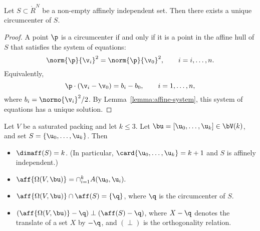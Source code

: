 \begin{lemma}[] 
  Let $S\subset \ring{R}^N$ be a non-empty affinely independent set.
  Then there exists a unique circumcenter of $S$.
\end{lemma}

\begin{proof} 
  A point $\p$ is a circumcenter if and only if it is a point in the
  affine hull of $S$ that satisfies the system of equations:
\begin{displaymath} 
\norm{\p}{\v_i}^2 = \norm{\p}{\v_0}^2,\qquad i = i,\ldots,n.
\end{displaymath}
Equivalently,
\begin{displaymath} 
\p\cdot (\v_i-\v_0) = b_i-b_0,\qquad i=1,\ldots,n,
\end{displaymath}
where $b_i = \normo{\v_i}^2/2$.  By
Lemma~\ref{lemma:affine-system}, this system of equations has a unique
solution.
\end{proof}

\begin{lemma}[]\label{lemma:aff-center} 
Let $V$ be a saturated packing and let $k\le 3$.
Let $\bu=[\u_0,\ldots,\u_k]\in \bV(k)$, and set $S = \{\u_0,\ldots,\u_k\}$.
Then
\begin{itemize} 
\item $\dimaff (S)= k$.  (In particular, $\card\{\u_0,\ldots,\u_k\}=k+1$ and
$S$ is affinely independent.)
\item $\aff{\Omega(V,\bu)}= \cap_{i=1}^k A(\u_0,\u_i).$
\item $\aff{\Omega(V,\bu)} \cap \aff(S) = \{\q\}$, 
where $\q$ is the circumcenter of $S$.
\item $(\aff{\Omega(V,\bu)}-\q) \perp (\aff(S)-\q)$, where
  $X-\q$ denotes the translate of a set $X$ by $-\q$, and $(\perp)$ is
  the orthogonality relation.
\end{itemize}
\end{lemma}


